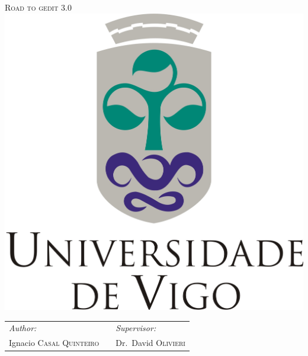 
\begin{titlepage}

\begin{center}


\textsc{\Huge Road to gedit 3.0}\\[2.0cm]

\includegraphics[scale=0.8]{./images/uvigo}\\

\vfill

\begin{tabularx}{\linewidth}{lXl}
  \emph{Author:} && \emph{Supervisor:} \\
  Ignacio \textsc{Casal Quinteiro} && Dr.~David \textsc{Olivieri}
\end{tabularx}

\end{center}

\end{titlepage}
